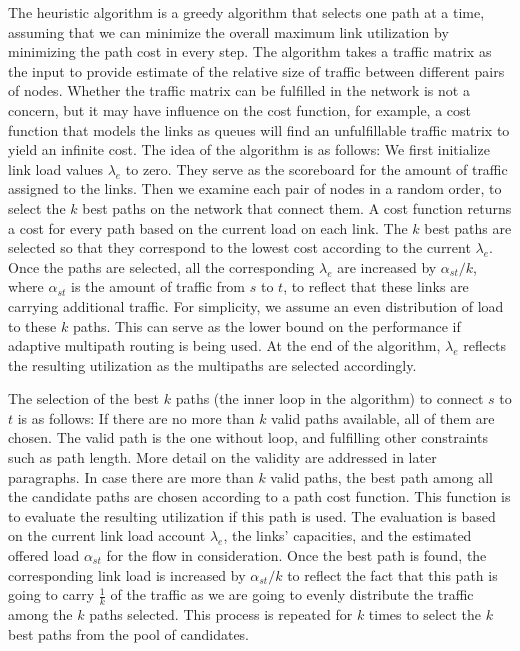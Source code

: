 \documentclass[conference]{IEEEtran}
\begin{document}
The heuristic algorithm is a greedy algorithm that selects one path at a time,
assuming that we can minimize the overall maximum link utilization by
minimizing the path cost in every step. The algorithm takes a traffic matrix as
the input to provide estimate of the relative size of traffic between different
pairs of nodes. Whether the traffic matrix can be fulfilled in the network is
not a concern, but it may have influence on the cost function, for example, a
cost function that models the links as queues will find an unfulfillable
traffic matrix to yield an infinite cost. The idea of the algorithm is as
follows: We first initialize link load values $\lambda_e$ to zero. They serve
as the scoreboard for the amount of traffic assigned to the links. Then we
examine each pair of nodes in a random order, to select the $k$ best paths on
the network that connect them. A cost function returns a cost for every path
based on the current load on each link. The $k$ best paths are selected so that
they correspond to the lowest cost according to the current $\lambda_e$. Once
the paths are selected, all the corresponding $\lambda_e$ are increased by
$\alpha_{st}/k$, where $\alpha_{st}$ is the amount of traffic from $s$ to $t$,
to reflect that these links are carrying additional traffic. For simplicity, we
assume an even distribution of load to these $k$ paths. This can serve as the
lower bound on the performance if adaptive multipath routing is being used. At
the end of the algorithm, $\lambda_e$ reflects the resulting utilization as the
multipaths are selected accordingly.

The selection of the best $k$ paths (the inner loop in the algorithm) to
connect $s$ to $t$ is as follows: If there are no more than $k$ valid paths
available, all of them are chosen. The valid path is the one without loop, and
fulfilling other constraints such as path length. More detail on the validity
are addressed in later paragraphs. In case there are more than $k$ valid paths,
the best path among all the candidate paths are chosen according to a path cost
function. This function is to evaluate the resulting utilization if this path
is used. The evaluation is based on the current link load account $\lambda_e$, the
links' capacities, and the estimated offered load $\alpha_{st}$ for the flow in
consideration. Once the best path is found, the corresponding link load is
increased by $\alpha_{st}/k$ to reflect the fact that this path is going to
carry $\frac{1}{k}$ of the traffic as we are going to evenly distribute the
traffic among the $k$ paths selected. This process is repeated for $k$ times to
select the $k$ best paths from the pool of candidates.
\end{document}
